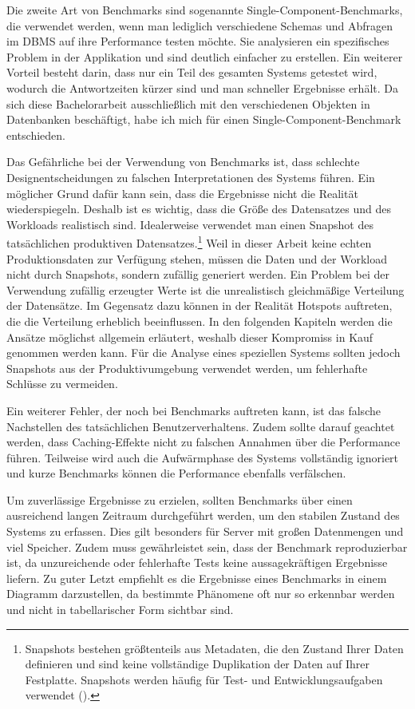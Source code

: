 Die zweite Art von Benchmarks sind sogenannte Single-Component-Benchmarks, die verwendet werden, wenn man lediglich verschiedene Schemas und Abfragen im DBMS auf ihre Performance testen möchte.
Sie analysieren ein spezifisches Problem in der Applikation und sind deutlich einfacher zu erstellen.
Ein weiterer Vorteil besteht darin, dass nur ein Teil des gesamten Systems getestet wird, wodurch die Antwortzeiten kürzer sind und man schneller Ergebnisse erhält.
Da sich diese Bachelorarbeit ausschließlich mit den verschiedenen Objekten in Datenbanken beschäftigt, habe ich mich für einen Single-Component-Benchmark entschieden.

Das Gefährliche bei der Verwendung von Benchmarks ist, dass schlechte Designentscheidungen zu falschen Interpretationen des Systems führen.
Ein möglicher Grund dafür kann sein, dass die Ergebnisse nicht die Realität wiederspiegeln.
Deshalb ist es wichtig, dass die Größe des Datensatzes und des Workloads realistisch sind.
Idealerweise verwendet man einen Snapshot des tatsächlichen produktiven Datensatzes.\footnote{Snapshots bestehen größtenteils aus Metadaten, die den Zustand Ihrer Daten definieren und sind keine vollständige Duplikation der Daten auf Ihrer Festplatte. Snapshots werden häufig für Test- und Entwicklungsaufgaben verwendet (\cite{snapshot}).}
Weil in dieser Arbeit keine echten Produktionsdaten zur Verfügung stehen, müssen die Daten und der Workload nicht durch Snapshots, sondern zufällig generiert werden.
Ein Problem bei der Verwendung zufällig erzeugter Werte ist die unrealistisch gleichmäßige Verteilung der Datensätze.
Im Gegensatz dazu können in der Realität Hotspots auftreten, die die Verteilung erheblich beeinflussen.
In den folgenden Kapiteln werden die Ansätze möglichst allgemein erläutert, weshalb dieser Kompromiss in Kauf genommen werden kann.
Für die Analyse eines speziellen Systems sollten jedoch Snapshots aus der Produktivumgebung verwendet werden, um fehlerhafte Schlüsse zu vermeiden.

Ein weiterer Fehler, der noch bei Benchmarks auftreten kann, ist das falsche Nachstellen des tatsächlichen Benutzerverhaltens.
Zudem sollte darauf geachtet werden, dass Caching-Effekte nicht zu falschen Annahmen über die Performance führen.
Teilweise wird auch die Aufwärmphase des Systems vollständig ignoriert und kurze Benchmarks können die Performance ebenfalls verfälschen.

Um zuverlässige Ergebnisse zu erzielen, sollten Benchmarks über einen ausreichend langen Zeitraum durchgeführt werden, um den stabilen Zustand des Systems zu erfassen.
Dies gilt besonders für Server mit großen Datenmengen und viel Speicher.
Zudem muss gewährleistet sein, dass der Benchmark reproduzierbar ist, da unzureichende oder fehlerhafte Tests keine aussagekräftigen Ergebnisse liefern.
Zu guter Letzt empfiehlt es die Ergebnisse eines Benchmarks in einem Diagramm darzustellen, da bestimmte Phänomene oft nur so erkennbar werden und nicht in tabellarischer Form sichtbar sind.

